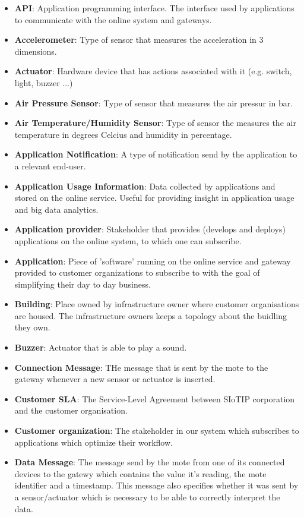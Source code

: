 \documentclass[english]{sareport}
\begin{document}
\begin{itemize}
	\item \textbf{API}: Application programming interface. The interface used by applications to communicate with the online system and gateways.
	\item \textbf{Accelerometer}: Type of sensor that measures the acceleration in 3 dimensions.
	\item \textbf{Actuator}: Hardware device that has actions associated with it (e.g. switch, light, buzzer ...)
	\item \textbf{Air Pressure Sensor}: Type of sensor that measures the air pressur in bar.
	\item \textbf{Air Temperature/Humidity Sensor}: Type of sensor the measures the air temperature in degrees Celcius and humidity in percentage.
	\item \textbf{Application Notification}: A type of notification send by the application to a relevant end-user.
	\item \textbf{Application Usage Information}: Data collected by applications and stored on the online service. Useful for providing insight in application usage and big data analytics.
	\item \textbf{Application provider}: Stakeholder that provides (develops and deploys) applications on the online system, to which one can subscribe.
	\item \textbf{Application}: Piece of 'software' running on the online service and gateway provided to customer organizations to subscribe to with the goal of simplifying their day to day business.
	\item \textbf{Building}: Place owned by infrastructure owner where customer organisations are housed. The infrastructure owners keeps a topology about the buidling they own.
	\item \textbf{Buzzer}: Actuator that is able to play a sound.
	\item \textbf{Connection Message}: THe message that is sent by the mote to the gateway whenever a new sensor or actuator is inserted.
	\item \textbf{Customer SLA}: The Service-Level Agreement between SIoTIP corporation and the customer organisation.
	\item \textbf{Customer organization}: The stakeholder in our system which subscribes to applications which optimize their workflow.
	\item \textbf{Data Message}: The message send by the mote from one of its connected devices to the gatewy which contains the value it's reading, the mote identifier and a timestamp. This message also specifies whether it was sent by a sensor/actuator which is necessary to be able to correctly interpret the data.

\end{itemize}
\end{document}
